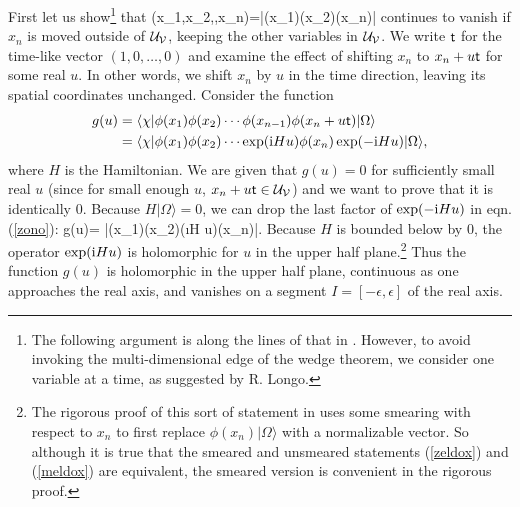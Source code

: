 \documentclass[12pt]{article}
\numberwithin{equation}{section}
\begin{document}
First let us show\footnote{The following
argument is along the lines of that in \cite{StW}.  However, to avoid invoking the multi-dimensional edge of the wedge theorem,
we consider one variable at a time, as suggested by R. Longo.}  that
\be\label{goodness}\varphi(x_1,x_2,\cdots,x_n)=\langle\chi|\phi(x_1)\phi(x_2)\cdots \phi(x_n)|\Omega\rangle\ee
  continues to vanish if $x_n$ is moved outside of ${\mathcal U}_{\mathcal V}$, keeping the other variables in ${\mathcal U}_{\mathcal V}$.  We write
${\sf t}$ for the time-like vector $(1,0,\dots,0)$ and examine the effect of shifting $x_n$ to $x_n+u{\sf t}$ for some real $u$.  In other words,
we shift $x_n$ by $u$ in the time direction, leaving its spatial coordinates unchanged.
Consider the function
\begin{align}
\begin{split}
\label{zono}g(u)&=\langle\chi|\phi(x_1)\phi(x_2)\cdots \phi(x_{n-1})\phi(x_n+u{\sf t})|\Omega\rangle\\
&=\langle\chi|\phi(x_1)\phi(x_2)\cdots \exp({\mathrm i} H u)\phi(x_n)\exp(-{\mathrm i} H u)|\Omega\rangle,
\end{split}
\end{align}
where $H$ is the Hamiltonian.  We are given that $g(u)=0$ for sufficiently small real $u$ (since for small enough $u$, $x_n+u{\sf t}\in {\mathcal U}_{\mathcal V}$)
and we want to prove that it is identically 0.  Because $H|\Omega\rangle=0$, we can drop the last factor of $\exp(-{\mathrm i} H u)$ in eqn.
(\ref{zono}):
\be\label{zongo}g(u)=
\langle\chi|\phi(x_1)\phi(x_2)\cdots \exp(\i H u)\phi(x_n)|\Omega\rangle.\ee
Because $H$ is bounded below by 0, the operator $\exp({\mathrm i} H u)$ is holomorphic for $u$ in the upper half plane.\footnote{The rigorous
proof of this sort of statement in \cite{StW} uses some smearing with respect to $x_n$ to first replace $\phi(x_n)|\Omega\rangle$
with a normalizable vector.  So although it is true that the smeared and unsmeared statements (\ref{zeldox}) and (\ref{meldox})
are equivalent, the smeared version is convenient in the rigorous proof.}  Thus the function
$g(u)$ is holomorphic in the upper half plane, continuous as one approaches the real axis, and vanishes on a segment $I=[-\epsilon,\epsilon]$ of the real axis.
\end{document}
